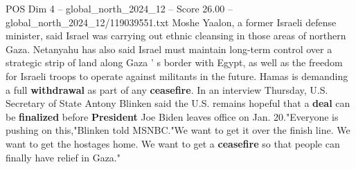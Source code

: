 \begin{textsample}{POS Dim 4 – global\_north\_2024\_12 – Score 26.00 – global\_north\_2024\_12/119039551.txt}
Moshe Yaalon, a former Israeli defense minister, said Israel was carrying out ethnic cleansing in those areas of northern Gaza.
Netanyahu has also said Israel must maintain long-term control over a strategic strip of land along Gaza ' s border with Egypt, as well as the freedom for Israeli troops to operate against militants in the future.
Hamas is demanding a full \textbf{withdrawal} as part of any \textbf{ceasefire}.
In an interview Thursday, U.S.
Secretary of State Antony Blinken said the U.S. remains hopeful that a \textbf{deal} can be \textbf{finalized} before \textbf{President} Joe Biden leaves office on Jan. 20."Everyone is pushing on this,"Blinken told MSNBC."We want to get it over the finish line.
We want to get the hostages home.
We want to get a \textbf{ceasefire} so that people can finally have relief in Gaza."

\end{textsample}
